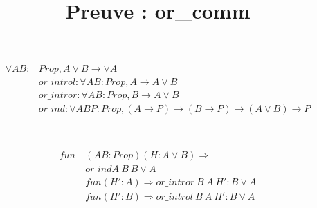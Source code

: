 \documentclass[11pt,a4paper]{article}
\title{Preuve : or\_comm}
\begin{document}
	\maketitle
	\begin{align*}
		\forall A B : &Prop, A \lor B \rightarrow \lor A\\
		&or\_introl : \forall A B : Prop, A \rightarrow A \lor B\\
		&or\_intror : \forall A B : Prop, B \rightarrow A \lor B\\
		&or\_ind : \forall A B P : Prop, (A \rightarrow P) \rightarrow (B \rightarrow P) \rightarrow (A \lor B) \rightarrow P\\
	\end{align*}
	\\\\
	\begin{align*}
	fun\ &(A B : Prop) (H: A \lor B) \Rightarrow\\
	&or\_ind A\ B\ B \lor A\\
	&fun (H' : A) \Rightarrow or\_intror\ B\ A\ H' : B \lor A\\
	&fun (H' : B) \Rightarrow or\_introl\ B\ A\ H' : B \lor A\\
	\end{align*}
\end{document}
